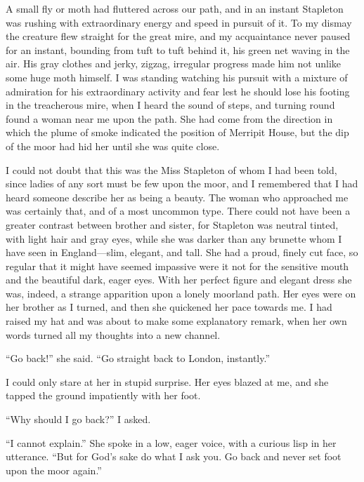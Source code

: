 \documentclass[paper=5.5in:8.5in,BCOR=7mm,twoside,DIV=calc,12pt,usegeometry,openany,chapterprefix,endperiod]{scrbook} %
\begin{document}

A small fly or moth had fluttered across our path, and in an instant Stapleton was rushing with extraordinary energy and speed in pursuit of it. To my dismay the creature flew straight for the great mire, and my acquaintance never paused for an instant, bounding from tuft to tuft behind it, his green net waving in the air. His gray clothes and jerky, zigzag, irregular progress made him not unlike some huge moth himself. I was standing watching his pursuit with a mixture of admiration for his extraordinary activity and fear lest he should lose his footing in the treacherous mire, when I heard the sound of steps, and turning round found a woman near me upon the path. She had come from the direction in which the plume of smoke indicated the position of Merripit House, but the dip of the moor had hid her until she was quite close.

I could not doubt that this was the Miss Stapleton of whom I had been told, since ladies of any sort must be few upon the moor, and I remembered that I had heard someone describe her as being a beauty. The woman who approached me was certainly that, and of a most uncommon type. There could not have been a greater contrast between brother and sister, for Stapleton was neutral tinted, with light hair and gray eyes, while she was darker than any brunette whom I have seen in England\nobreakdash---slim, elegant, and tall. She had a proud, finely cut face, so regular that it might have seemed impassive were it not for the sensitive mouth and the beautiful dark, eager eyes. With her perfect figure and elegant dress she was, indeed, a strange apparition upon a lonely moorland path. Her eyes were on her brother as I turned, and then she quickened her pace towards me. I had raised my hat and was about to make some explanatory remark, when her own words turned all my thoughts into a new channel.

\enquote{Go back!} she said. \enquote{Go straight back to London, instantly.}

I could only stare at her in stupid surprise. Her eyes blazed at me, and she tapped the ground impatiently with her foot.

\enquote{Why should I go back?} I asked.

\enquote{I cannot explain.} She spoke in a low, eager voice, with a curious lisp in her utterance. \enquote{But for God's sake do what I ask you. Go back and never set foot upon the moor again.}
\end{document}
